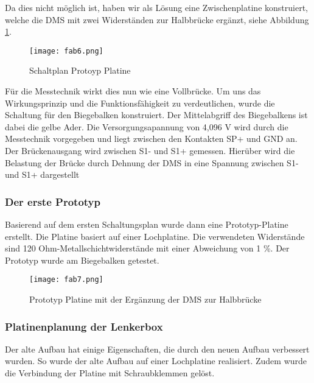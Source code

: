 Da dies nicht möglich ist, haben wir als Lösung eine Zwischenplatine konstruiert, welche die DMS mit zwei Widerständen zur Halbbrücke ergänzt, siehe Abbildung \ref{fig:fab6}.

\begin{figure}[h]
    \begin{center}
        \texttt{[image: fab6.png]}
        \caption[Schaltplan Protoyp Platine (Abbildungsverzeichnis)]{Schaltplan Protoyp Platine}
        
        \label{fig:fab6}
    \end{center}
\end{figure}

Für die Messtechnik wirkt dies nun wie eine Vollbrücke. Um uns das Wirkungsprinzip und die Funktionsfähigkeit zu verdeutlichen, wurde die Schaltung für den Biegebalken konstruiert.
Der Mittelabgriff des Biegebalkens ist dabei die gelbe Ader. Die Versorgungsapannung von 4,096 V wird durch die Messtechnik vorgegeben und liegt zwischen den Kontakten SP+ und GND an. Der Brückenausgang wird zwischen S1- und S1+ gemessen. Hierüber wird die Belastung der Brücke durch Dehnung der DMS in eine Spannung zwischen S1- und S1+ dargestellt
\subsubsection{Der erste Prototyp}
Basierend auf dem ersten Schaltungsplan wurde dann eine Prototyp-Platine erstellt. Die Platine basiert auf einer Lochplatine.
Die verwendeten Widerstände sind 120 Ohm-Metallschichtwiderstände mit einer Abweichung von 1 \%. Der Prototyp wurde am Biegebalken getestet.
\begin{figure}[h]
    \begin{center}
        \texttt{[image: fab7.png]}
        \caption[Prototyp Platine mit der Ergänzung der DMS zur Halbbrücke (Abbildungsverzeichnis)]{Prototyp Platine mit der Ergänzung der DMS zur Halbbrücke}
        
        \label{fig:fab7}
    \end{center}
\end{figure}


\clearpage
\subsubsection{Platinenplanung der Lenkerbox}
Der alte Aufbau hat einige Eigenschaften, die durch den neuen Aufbau verbessert wurden. So wurde der alte Aufbau auf einer Lochplatine realisiert.
Zudem wurde die Verbindung der Platine mit Schraubklemmen gelöst.

